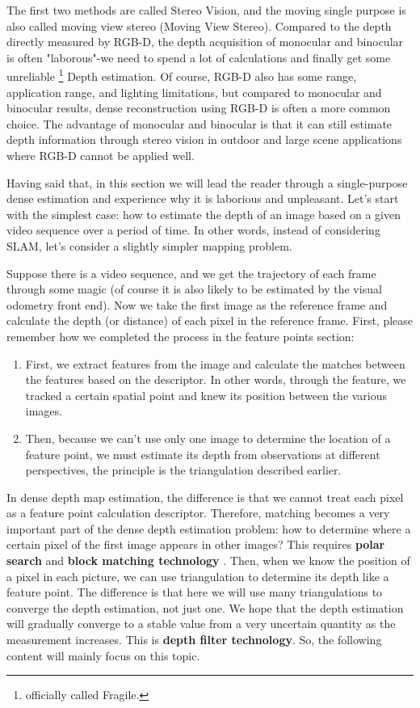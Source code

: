 The first two methods are called Stereo Vision, and the moving single purpose is also called moving view stereo (Moving View Stereo). Compared to the depth directly measured by RGB-D, the depth acquisition of monocular and binocular is often "laborous"-we need to spend a lot of calculations and finally get some unreliable \footnote{officially called Fragile. } Depth estimation. Of course, RGB-D also has some range, application range, and lighting limitations, but compared to monocular and binocular results, dense reconstruction using RGB-D is often a more common choice. The advantage of monocular and binocular is that it can still estimate depth information through stereo vision in outdoor and large scene applications where RGB-D cannot be applied well.

Having said that, in this section we will lead the reader through a single-purpose dense estimation and experience why it is laborious and unpleasant. Let's start with the simplest case: how to estimate the depth of an image based on a given video sequence over a period of time. In other words, instead of considering SLAM, let's consider a slightly simpler mapping problem.

Suppose there is a video sequence, and we get the trajectory of each frame through some magic (of course it is also likely to be estimated by the visual odometry front end). Now we take the first image as the reference frame and calculate the depth (or distance) of each pixel in the reference frame. First, please remember how we completed the process in the feature points section:

\begin{enumerate}
\item First, we extract features from the image and calculate the matches between the features based on the descriptor. In other words, through the feature, we tracked a certain spatial point and knew its position between the various images.
\item Then, because we can't use only one image to determine the location of a feature point, we must estimate its depth from observations at different perspectives, the principle is the triangulation described earlier.
\end{enumerate}

In dense depth map estimation, the difference is that we cannot treat each pixel as a feature point calculation descriptor. Therefore, matching becomes a very important part of the dense depth estimation problem: how to determine where a certain pixel of the first image appears in other images? This requires \textbf{polar search} and \textbf{block matching technology} \textsuperscript{\cite{Pizzoli2014}}. Then, when we know the position of a pixel in each picture, we can use triangulation to determine its depth like a feature point. The difference is that here we will use many triangulations to converge the depth estimation, not just one. We hope that the depth estimation will gradually converge to a stable value from a very uncertain quantity as the measurement increases. This is \textbf{depth filter technology}. So, the following content will mainly focus on this topic.

